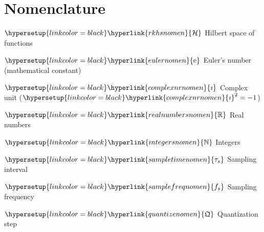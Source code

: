 \section*{Nomenclature}\label{nomenclature}
\thispagestyle{empty}
\sffamily

\def\mylhypertarget{rkhsnomen}
\newcommand{\hilbertspace}{\hypersetup{linkcolor=\mymathcolor}\hyperlink{\mylhypertarget}{\mathcal{H}}}%
{$\hilbertspace$ \myltab \hypertarget{\mylhypertarget}{Hilbert space of functions} \par}


\def\mylhypertarget{eulernomen}
\newcommand{\euler}{\hypersetup{linkcolor=\mymathcolor}\hyperlink{eulernomen}{\text{e}}}%
{\normalfont$\euler$ \sffamily\myltab \hypertarget{\mylhypertarget}{Euler's number (mathematical constant)} \par}

\def\mylhypertarget{complexnrnomen}
\newcommand{\complexunit}{\hypersetup{linkcolor=\mymathcolor}\hyperlink{\mylhypertarget}{\imath}}%
{$\complexunit$ \myltab \hypertarget{\mylhypertarget}{Complex unit ($\complexunit^2=-1$)} \par}

\def\mylhypertarget{realnumbersnomen}
\newcommand{\realnumbers}{\hypersetup{linkcolor=\mymathcolor}\hyperlink{\mylhypertarget}{\mathbb{R}}}%
{$\realnumbers$ \myltab \hypertarget{\mylhypertarget}{Real numbers} \par}

\def\mylhypertarget{integersnomen}
\newcommand{\integers}{\hypersetup{linkcolor=\mymathcolor}\hyperlink{\mylhypertarget}{\mathbb{N}}}%
{$\integers$ \myltab \hypertarget{\mylhypertarget}{Integers} \par}

\def\mylhypertarget{sampletimenomen}
\newcommand{\sampletime}{\hypersetup{linkcolor=\mymathcolor}\hyperlink{\mylhypertarget}{{\tau_{s}}}}%
{$\sampletime$ \myltab \hypertarget{\mylhypertarget}{Sampling interval} \par}

\def\mylhypertarget{samplefreqnomen}
\newcommand{\samplingfreq}{\hypersetup{linkcolor=\mymathcolor}\hyperlink{\mylhypertarget}{{f_{s}}}}%
{$\samplingfreq$ \myltab \hypertarget{\mylhypertarget}{Sampling frequency} \par}

\def\mylhypertarget{quantizenomen}
\newcommand{\quantizestep}{\hypersetup{linkcolor=\mymathcolor}\hyperlink{\mylhypertarget}{{\mathfrak{Q}}}}%
{$\quantizestep$ \myltab \hypertarget{\mylhypertarget}{Quantization step} \par}

\newcommand{\myendofproof}{\hfill\text{${\Box} $}}
\newcommand{\myendofproofequation}{\hfill\text{$\tag*{\Box} $}}

\normalfont
\cleardoublepage